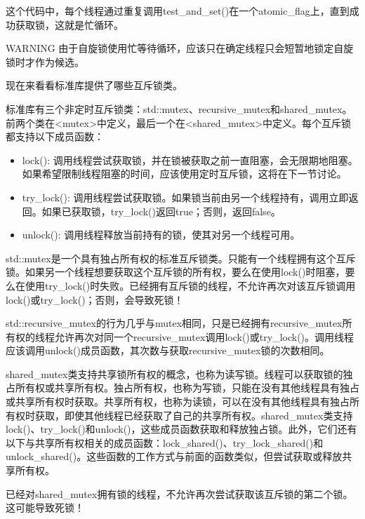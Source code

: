 这个代码中，每个线程通过重复调用test\_and\_set()在一个atomic\_flag上，直到成功获取锁，这就是忙循环。

\begin{myWarning}{WARNING}
由于自旋锁使用忙等待循环，应该只在确定线程只会短暂地锁定自旋锁时才作为候选。
\end{myWarning}

现在来看看标准库提供了哪些互斥锁类。


标准库有三个非定时互斥锁类：std::mutex、recursive\_mutex和shared\_mutex。前两个类在<mutex>中定义，最后一个在<shared\_mutex>中定义。每个互斥锁都支持以下成员函数：

\begin{itemize}
\item
lock(): 调用线程尝试获取锁，并在锁被获取之前一直阻塞，会无限期地阻塞。如果希望限制线程阻塞的时间，应该使用定时互斥锁，这将在下一节讨论。

\item
try\_lock(): 调用线程尝试获取锁。如果锁当前由另一个线程持有，调用立即返回。如果已获取锁，try\_lock()返回true；否则，返回false。

\item
unlock(): 调用线程释放当前持有的锁，使其对另一个线程可用。
\end{itemize}

std::mutex是一个具有独占所有权的标准互斥锁类。只能有一个线程拥有这个互斥锁。如果另一个线程想要获取这个互斥锁的所有权，要么在使用lock()时阻塞，要么在使用try\_lock()时失败。已经拥有互斥锁的线程，不允许再次对该互斥锁调用lock()或try\_lock()；否则，会导致死锁！

std::recursive\_mutex的行为几乎与mutex相同，只是已经拥有recursive\_mutex所有权的线程允许再次对同一个recursive\_mutex调用lock()或try\_lock()。调用线程应该调用unlock()成员函数，其次数与获取recursive\_mutex锁的次数相同。

shared\_mutex类支持共享锁所有权的概念，也称为读写锁。线程可以获取锁的独占所有权或共享所有权。独占所有权，也称为写锁，只能在没有其他线程具有独占或共享所有权时获取。共享所有权，也称为读锁，可以在没有其他线程具有独占所有权时获取，即使其他线程已经获取了自己的共享所有权。shared\_mutex类支持lock()、try\_lock()和unlock()，这些成员函数获取和释放独占锁。此外，它们还有以下与共享所有权相关的成员函数：lock\_shared()、try\_lock\_shared()和unlock\_shared()。这些函数的工作方式与前面的函数类似，但尝试获取或释放共享所有权。

已经对shared\_mutex拥有锁的线程，不允许再次尝试获取该互斥锁的第二个锁。这可能导致死锁！

